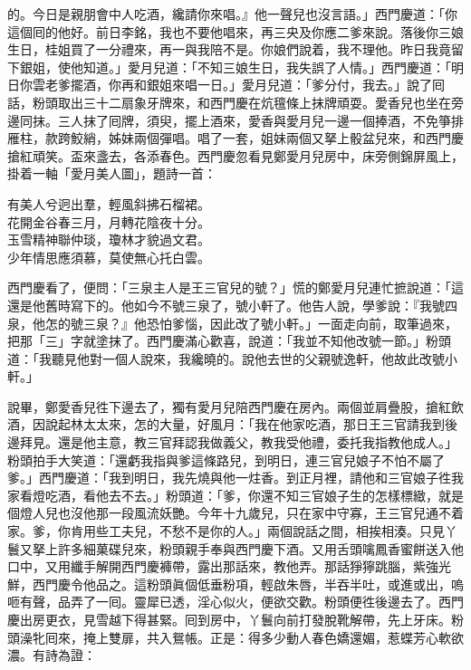 的。今日是親朋會中人吃酒，纔請你來唱。』他一聲兒也沒言語。」西門慶道：「你這個囘的他好。前日李銘，我也不要他唱來，再三央及你應二爹來說。落後你三娘生日，桂姐買了一分禮來，再一與我陪不是。你娘們說着，我不理他。昨日我竟留下銀姐，使他知道。」愛月兒道：「不知三娘生日，我失誤了人情。」西門慶道：「明日你雲老爹擺酒，你再和銀姐來唱一日。」愛月兒道：「爹分付，我去。」說了囘話，粉頭取出三十二扇象牙牌來，和西門慶在炕氊條上抹牌頑耍。愛香兒也坐在旁邊同抹。三人抹了囘牌，須臾，擺上酒來，愛香與愛月兒一邊一個捧酒，不免箏排雁柱，款跨鮫綃，姊妹兩個彈唱。唱了一套，姐妹兩個又拏上骰盆兒來，和西門慶搶紅頑笑。盃來盞去，各添春色。西門慶忽看見鄭愛月兒房中，床旁側錦屏風上，掛着一軸「愛月美人圖」，題詩一首：

\begin{myquote} 
有美人兮迥出羣，輕風斜拂石榴裙。\\花開金谷春三月，月轉花陰夜十分。\\玉雪精神聯仲琰，瓊林才貌過文君。\\少年情思應須慕，莫使無心托白雲。{}

\end{myquote} 

西門慶看了，便問：「三泉主人是王三官兒的號？」慌的鄭愛月兒連忙摭說道：「這還是他舊時寫下的。他如今不號三泉了，號小軒了。{}他告人說，學爹說：『我號四泉，他怎的號三泉？』他恐怕爹惱，因此改了號小軒。」一面走向前，取筆過來，把那「三」字就塗抹了。西門慶滿心歡喜，{}說道：「我並不知他改號一節。」粉頭道：「我聽見他對一個人說來，我纔曉的。說他去世的父親號逸軒，他故此改號小軒。」

說畢，鄭愛香兒徃下邊去了，獨有愛月兒陪西門慶在房內。兩個並肩疊股，搶紅飲酒，因說起林太太來，怎的大量，好風月：「我在他家吃酒，那日王三官請我到後邊拜見。還是他主意，教三官拜認我做義父，教我受他禮，委托我指教他成人。」{}粉頭拍手大笑道：「還虧我指與爹這條路兒，到明日，連三官兒娘子不怕不屬了爹。」{}西門慶道：「我到明日，我先燒與他一炷香。到正月裡，請他和三官娘子徃我家看燈吃酒，看他去不去。」粉頭道：「爹，你還不知三官娘子生的怎樣標緻，就是個燈人兒也沒他那一段風流妖艷。今年十九歲兒，只在家中守寡，王三官兒通不着家。{}爹，你肯用些工夫兒，不愁不是你的人。」兩個說話之間，相挨相湊。只見丫鬟又拏上許多細菓碟兒來，粉頭親手奉與西門慶下酒。又用舌頭噙鳳香蜜餅送入他口中，又用纖手解開西門慶褲帶，露出那話來，教他弄。那話猙獰跳腦，紫強光鮮，西門慶令他品之。這粉頭眞個低垂粉項，輕啟朱唇，半吞半吐，或進或出，嗚咂有聲，品弄了一囘。靈犀已透，淫心似火，便欲交歡。粉頭便徃後邊去了。西門慶出房更衣，見雪越下得甚緊。囘到房中，丫鬟向前打發脫靴解帶，先上牙床。粉頭澡牝囘來，掩上雙扉，共入鴛帳。正是：得多少動人春色嬌還媚，惹蝶芳心軟欲濃。有詩為證：

